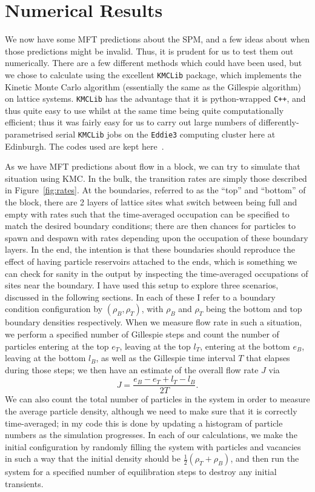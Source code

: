 \section{Numerical Results}
\label{sec:numRes}
We now have some MFT predictions about the SPM, and a few ideas about when those predictions might be invalid. Thus, it is prudent for us to test them out numerically.
There are a few different methods which could have been used, but we chose to calculate using the excellent \texttt{KMCLib}\cite{leetmaa2014kmclib} package, which implements the Kinetic Monte Carlo algorithm (essentially the same as the Gillespie algorithm)
on lattice systems. \texttt{KMCLib} has the advantage that it is python-wrapped \texttt{C++}, and thus quite easy to use whilst at the same time being quite computationally efficient; thus it was fairly easy for us to carry out large numbers
of differently-parametrised serial \texttt{KMCLib} jobs on the \texttt{Eddie3} computing cluster here at Edinburgh. The codes used are kept here~\cite{jHellGitRepo}.

As we have MFT predictions about flow in a block, we can try to simulate that situation using KMC. In the bulk, the transition rates are simply those described in Figure~\ref{fig:rates}. At the boundaries, referred to as the ``top''  and ``bottom''
of the block, there are 2 layers of lattice sites what switch between being full and empty with rates such that the time-averaged occupation can be specified to match the desired boundary conditions; there are then chances for particles to spawn
and despawn with rates depending upon the occupation of these boundary layers. In the end, the intention is that these boundaries should reproduce the effect of having particle reservoirs attached to the ends, which is something we can check for
sanity in the output by inspecting the time-averaged occupations of sites near the boundary. I have used this setup to explore three scenarios, discussed in the following sections. In each of these I refer to a boundary condition configuration
by $(\rho_B, \rho_T)$, with $\rho_B$ and $\rho_T$ being the bottom and top boundary densities respectively.
When we measure flow rate in such a situation, we perform a specified number of Gillespie steps and count the number of particles entering at the top $e_T$, leaving at the top $l_T$, entering at the bottom $e_B$, leaving at the bottom $l_B$,
as well as the Gillespie time interval $T$ that elapses during those steps; we then have an estimate of the overall flow rate $J$ via
\begin{equation}
 J = \frac{e_B-e_T+l_T-l_B}{2T}.
\end{equation}
We can also count the total number of particles in the system in order to measure the average particle density, although we need to make sure that it is correctly time-averaged; in my code this is done by updating a histogram of particle numbers
as the simulation progresses. In each of our calculations, we make the initial configuration by randomly filling the system with particles and vacancies in such a way that the initial density should be $\frac{1}{2}(\rho_T + \rho_B)$, and then
run the system for a specified number of equilibration steps to destroy any initial transients.

